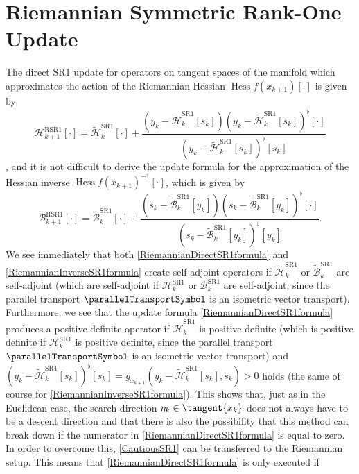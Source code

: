 \section{Riemannian Symmetric Rank-One Update}

The direct SR1 update for operators on tangent spaces of the manifold which approximates the action of the Riemannian Hessian $\operatorname{Hess} f(x_{k+1}) [\cdot]$ is given by 
\begin{equation}\label{RiemannianDirectSR1formula}
    \mathcal{H}^\mathrm{RSR1}_{k+1} [\cdot] = \widetilde{\mathcal{H}}^\mathrm{SR1}_k [\cdot] + \frac{(y_k - \widetilde{\mathcal{H}}^\mathrm{SR1}_k [s_k]) (y_k - \widetilde{\mathcal{H}}^\mathrm{SR1}_k [s_k])^{\flat} [\cdot] }{(y_k - \widetilde{\mathcal{H}}^\mathrm{SR1}_k [s_k])^{\flat} [s_k]}
\end{equation}
\cite[p.~18]{Huang:2013}, and it is not difficult to derive the update formula for the approximation of the Hessian inverse ${\operatorname{Hess} f(x_{k+1})}^{-1} [\cdot]$, which is given by 
\begin{equation}\label{RiemannianInverseSR1formula}
    \mathcal{B}^\mathrm{RSR1}_{k+1} [\cdot] = \widetilde{\mathcal{B}}^\mathrm{SR1}_k [\cdot] + \frac{(s_k - \widetilde{\mathcal{B}}^\mathrm{SR1}_k [y_k]) (s_k - \widetilde{\mathcal{B}}^\mathrm{SR1}_k [y_k])^{\flat} [\cdot] }{(s_k - \widetilde{\mathcal{B}}^\mathrm{SR1}_k [y_k])^{\flat} [y_k]}.
\end{equation}
We see immediately that both \cref{RiemannianDirectSR1formula} and \cref{RiemannianInverseSR1formula} create self-adjoint operators if $\widetilde{\mathcal{H}}^\mathrm{SR1}_k$ or $\widetilde{\mathcal{B}}^\mathrm{SR1}_k$ are self-adjoint (which are self-adjoint if $\mathcal{H}^\mathrm{SR1}_k$ or $\mathcal{B}^\mathrm{SR1}_k$ are self-adjoint, since the parallel transport $\parallelTransportSymbol$ is an isometric vector transport). Furthermore, we see that the update formula \cref{RiemannianDirectSR1formula} produces a positive definite operator if $\widetilde{\mathcal{H}}^\mathrm{SR1}_k$ is positive definite (which is positive definite if $\mathcal{H}^\mathrm{SR1}_k$ is positive definite, since the parallel transport $\parallelTransportSymbol$ is an isometric vector transport) and $(y_k - \widetilde{\mathcal{H}}^\mathrm{SR1}_k [s_k])^{\flat} [s_k] = g_{x_{k+1}}(y_k - \widetilde{\mathcal{H}}^\mathrm{SR1}_k [s_k], s_k) >0$ holds (the same of course for \cref{RiemannianInverseSR1formula}). This shows that, just as in the Euclidean case, the search direction $\eta_k \in \tangent{x_k}$ does not always have to be a descent direction and that there is also the possibility that this method can break down if the numerator in \cref{RiemannianDirectSR1formula} is equal to zero. In order to overcome this, \cref{CautiousSR1} can be transferred to the Riemannian setup. This means that \cref{RiemannianDirectSR1formula} is only executed if
